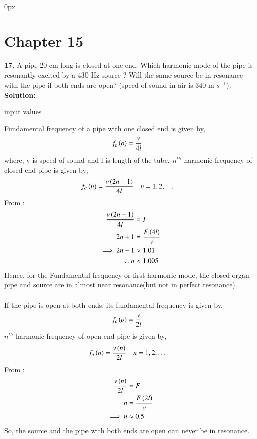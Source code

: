 \documentclass[journal,12pt,twocolumn]{IEEEtran}
\begin{document}
	\parindent 0px
	
	
	\vspace{3cm}
	
	\title{}
	\author{EE23BTECH11209 - K S Ballvardhan$^{*}$
	}
	\maketitle
	\newpage
	\bigskip
	
	
	
	\section*{Chapter 15}
	
	\noindent \textbf{17.} A pipe 20 cm long is closed at one end. Which harmonic mode of the pipe is resonantly excited by a 430 Hz source ? Will the same source be in resonance with
	the pipe if both ends are open? (speed of sound in air is 340 m $s^{-1}$).\\
	
	\textbf {Solution: }
	
	\begin{table}[ht] 
		\centering
		
		\caption{input values}
		\label{tab: Table analog1}
	\end{table}
	Fundamental frequency of a pipe with one closed end is given by,
	\begin{align}
		f_c\left(o\right) &= \frac{v}{4l}
	\end{align}
	where, v is speed of sound and l is length of the tube.
	$ n^{th}$ harmonic frequency of closed-end pipe is given by,
	\begin{align}
		f_c\left(n\right) &= \frac{v\left(2n+1\right)}{4l}\quad n= 1,2,\dots
	\end{align}
	From :
	\begin{align}
		\frac{v\left(2n-1\right)}{4l} &= F\\
		2n+1 &= \frac{F\left(4l\right)}{v}\\
		\implies 2n-1 &\approx 1.01\\
		\therefore n&\approx 1.005
	\end{align}
	Hence, for the Fundamental frequency or first harmonic mode, the closed organ pipe and source are in almost near resonance(but not in perfect resonance).\\\\
	If the pipe is open at both ends, its fundamental frequency is given by,
	\begin{align}
		f_c\left(o\right) &= \frac{v}{2l}
	\end{align}
	$ n^{th}$ harmonic frequency of open-end pipe is given by,
	\begin{align}
		f_o\left(n\right) &= \frac{v\left(n\right)}{2l}\quad n= 1,2,\dots
	\end{align}
	From :
	\begin{align}
		\frac{v\left(n\right)}{2l} &= F\\
		n &= \frac{F\left(2l\right)}{v}\\
		\implies n &\approx 0.5
	\end{align}
	So, the source and the pipe with both ends are open can never be in resonance.
\end{document}
